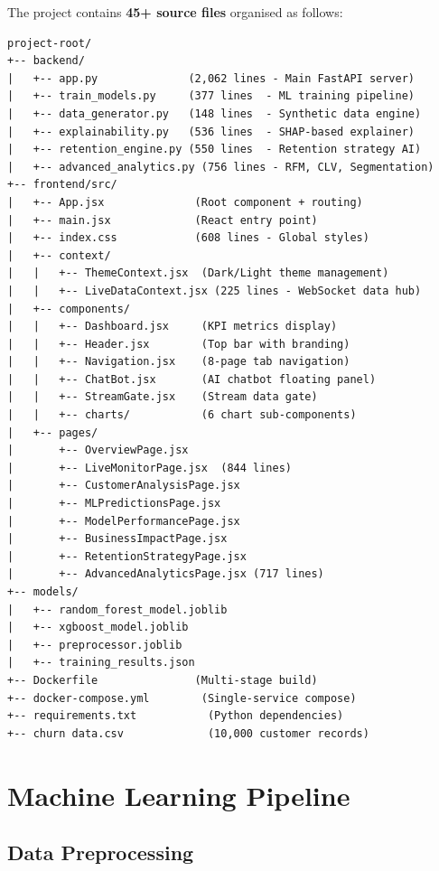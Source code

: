 \documentclass[12pt, a4paper]{report}
\begin{document}
The project contains \textbf{45+ source files} organised as follows:

\begin{lstlisting}[language={}, caption={Project Directory Structure}, label={lst:structure}]
project-root/
+-- backend/
|   +-- app.py              (2,062 lines - Main FastAPI server)
|   +-- train_models.py     (377 lines  - ML training pipeline)
|   +-- data_generator.py   (148 lines  - Synthetic data engine)
|   +-- explainability.py   (536 lines  - SHAP-based explainer)
|   +-- retention_engine.py (550 lines  - Retention strategy AI)
|   +-- advanced_analytics.py (756 lines - RFM, CLV, Segmentation)
+-- frontend/src/
|   +-- App.jsx              (Root component + routing)
|   +-- main.jsx             (React entry point)
|   +-- index.css            (608 lines - Global styles)
|   +-- context/
|   |   +-- ThemeContext.jsx  (Dark/Light theme management)
|   |   +-- LiveDataContext.jsx (225 lines - WebSocket data hub)
|   +-- components/
|   |   +-- Dashboard.jsx     (KPI metrics display)
|   |   +-- Header.jsx        (Top bar with branding)
|   |   +-- Navigation.jsx    (8-page tab navigation)
|   |   +-- ChatBot.jsx       (AI chatbot floating panel)
|   |   +-- StreamGate.jsx    (Stream data gate)
|   |   +-- charts/           (6 chart sub-components)
|   +-- pages/
|       +-- OverviewPage.jsx
|       +-- LiveMonitorPage.jsx  (844 lines)
|       +-- CustomerAnalysisPage.jsx
|       +-- MLPredictionsPage.jsx
|       +-- ModelPerformancePage.jsx
|       +-- BusinessImpactPage.jsx
|       +-- RetentionStrategyPage.jsx
|       +-- AdvancedAnalyticsPage.jsx (717 lines)
+-- models/
|   +-- random_forest_model.joblib
|   +-- xgboost_model.joblib
|   +-- preprocessor.joblib
|   +-- training_results.json
+-- Dockerfile               (Multi-stage build)
+-- docker-compose.yml        (Single-service compose)
+-- requirements.txt           (Python dependencies)
+-- churn data.csv             (10,000 customer records)
\end{lstlisting}


\chapter{Machine Learning Pipeline}

\section{Data Preprocessing}
\end{document}
